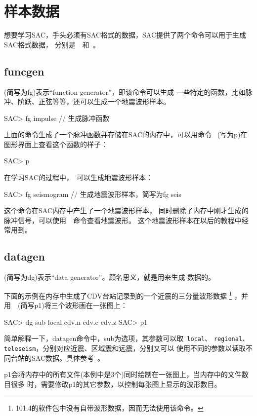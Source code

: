 \section{样本数据}
想要学习SAC，手头必须有SAC格式的数据，SAC提供了两个命令可以用于生成SAC格式数据，
分别是~~和~。

\subsection{funcgen}
(简写为fg)表示``function generator''，即该命令可以生成
一些特定的函数，比如脉冲、阶跃、正弦等等，还可以生成一个地震波形样本。
\begin{SACCode}
SAC> fg impulse         // 生成脉冲函数
\end{SACCode}
上面的命令生成了一个脉冲函数并存储在SAC的内存中，可以用命令~
(写为p)在图形界面上查看这个函数的样子：
\begin{SACCode}
SAC> p
\end{SACCode}

在学习SAC的过程中，~可以生成地震波形样本：
\begin{SACCode}
SAC> fg seismogram      // 生成地震波形样本，简写为fg seis
\end{SACCode}
这个命令在SAC内存中产生了一个地震波形样本，
同时删除了内存中刚才生成的脉冲信号，可以使用~~命令查看地震波形。
这个地震波形样本在以后的教程中经常用到。

\subsection{datagen}
(简写为dg)表示``data generator''。顾名思义，就是用来生成
数据的。

下面的示例在内存中生成了CDV台站记录到的一个近震的三分量波形数据
\footnote{101.4的软件包中没有自带波形数据，因而无法使用该命令。}
，并用~~(简写p1)将三个波形画在一张图上：
\begin{SACCode}
SAC> dg sub local cdv.n cdv.e cdv.z
SAC> p1
\end{SACCode}
简单解释一下，datagen命令中，sub为选项，其参数可以取~\verb+local+、
\verb+regional+、\verb+teleseism+，分别对应近震、区域震和远震，分别又可以
使用不同的参数以读取不同台站的SAC数据。具体参考~。

p1会将内存中的所有文件(本例中是3个)同时绘制在一张图上，当内存中的文件数目很多
时，需要修改p1的其它参数，以控制每张图上显示的波形数目。
